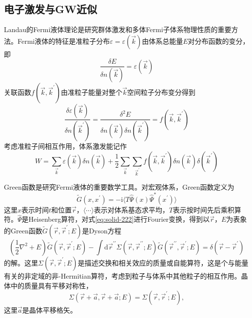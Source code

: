 \subsection{电子激发与GW近似}
Landau的Fermi液体理论是研究群体激发和多体Fermi子体系物理性质的重要方法\cite{Landau}。Fermi液体的特征是准粒子分布$\varepsilon=\varepsilon(\vec k)$由体系总能量$E$对分布函数的变分，即
\begin{equation}
  \frac{\delta E}{\delta n(\vec k)}=\varepsilon(\vec k)
  \label{eq:solid-219}
\end{equation}
关联函数$f(\vec k,\vec k^{\prime})$由准粒子能量对整个$\vec k$空间粒子分布变分得到
\begin{equation}
  \frac{\delta\varepsilon(\vec k)}{\delta n(\vec k^{\prime})}=\frac{\delta^2E}{\delta n(\vec k)\delta n(\vec k^{\prime})}=f(\vec k,\vec k^{\prime})
  \label{eq:solid-220}
\end{equation}
考虑准粒子间相互作用，体系激发能记作
\begin{equation}
  W=\sum_{\vec k}\varepsilon(\vec k)\delta n(\vec k)+\frac12\sum_{\vec k}\sum_{\vec k^{\prime}}f(\vec k,\vec k^{\prime})\delta n(\vec k)\delta(\vec k^{\prime})
  \label{eq:solid-221}
\end{equation}

Green函数是研究Fermi液体的重要数学工具。对宏观体系，Green函数定义为\cite{Lifshitz}
\begin{equation}
	\tilde G(x,x^{\prime})=-\mathrm{i}\langle T\hat\Psi(x)\hat\Psi^{\ast}(x^{\prime})\rangle
  \label{eq:solid-222}
\end{equation}
这里$x$表示时间$t$和位置$\vec r$，$\langle\cdots\rangle$表示对体系基态求平均，$T$表示按时间先后乘积算符。$\hat\Psi$是Heisenberg算符，对式\eqref{eq:solid-222}进行Fourier变换，得到以$\vec r$，$E$为表象的Green函数$\tilde G(\vec r,\vec r^{\prime};E)$是Dyson方程\cite{Lifshitz}
\begin{equation}
	(\dfrac12\nabla^2+E)\tilde G(\vec r,\vec r^{\prime};E)-\int\mathrm{d}\vec r^{\prime\prime}\Sigma(\vec r,\vec r^{\prime\prime};E)\tilde G(\vec r^{\prime\prime},\vec r^{\prime};E)=\delta(\vec r-\vec r^{\prime})
  \label{eq:solid-223}
\end{equation}
的解。这里$\Sigma(\vec r,\vec r^{\prime};E)$是描述交换和相关效应的质量或自能算符，这是个与能量有关的非定域的非-Hermitian算符，考虑到粒子与体系中其他粒子的相互作用。晶体中的质量具有平移对称性，
\begin{equation}
  \Sigma(\vec r+\vec a,\vec r+\vec a;E)=\Sigma(\vec r,\vec r^{\prime};E),
  \label{eq:solid:224}
\end{equation}
这里$\vec a$是晶体平移格矢。

